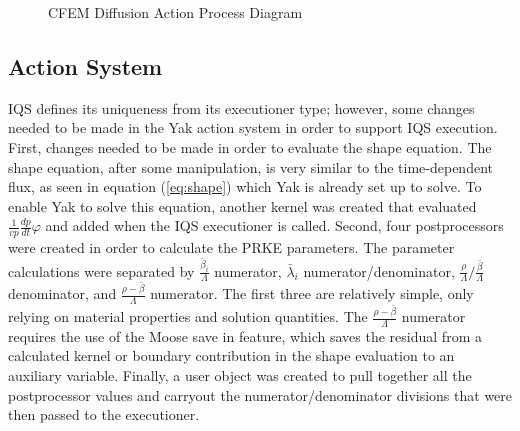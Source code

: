 \documentclass[12pt]{scrartcl}
\begin{document}
\begin{figure}[h]
\caption{CFEM Diffusion Action Process Diagram}   
\label{Action}
\end{figure}
\subsection{Action System}
IQS defines its uniqueness from its executioner type; however, some changes needed to be made in the Yak action system in order to support IQS execution.   First, changes needed to be made in order to evaluate the shape equation.  The shape equation, after some manipulation, is very similar to the time-dependent flux, as seen in equation (\ref{eq:shape}) which Yak is already set up to solve.  To enable Yak to solve this equation, another kernel was created that evaluated $\frac{1}{vp}\frac{dp}{dt}\varphi$ and added when the IQS executioner is called.  Second, four postprocessors were created in order to calculate the PRKE parameters.  The parameter calculations were separated by $\frac{\bar{\beta}_i}{\Lambda}$ numerator, $\bar{\lambda}_i$ numerator/denominator, $\frac{\rho}{\Lambda}/\frac{\bar{\beta}}{\Lambda}$ denominator, and $\frac{\rho-\bar{\beta}}{\Lambda}$ numerator.  The first three are relatively simple, only relying on material properties and solution quantities.  The $\frac{\rho-\bar{\beta}}{\Lambda}$ numerator requires the use of the Moose save in feature, which saves the residual from a calculated kernel or boundary contribution in the shape evaluation to an auxiliary variable.  Finally, a user object was created to pull together all the postprocessor values and carryout the numerator/denominator divisions that were then passed to the executioner.
\end{document}

